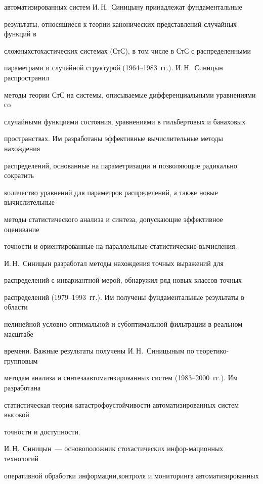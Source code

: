 автоматизированных систем И.\,Н.~Синицыну принад\-лежат фундаментальные 

результаты, относящиеся к теории канонических представлений случайных функций в 

сложных\linebreak стохастических системах (СтС), в том числе в СтС с распределенными 

параметрами и случайной структурой (1964--1983~гг.). И.\,Н.~Синицын распространил 

методы теории СтС на системы, описываемые дифференциальными уравнениями со 

случайными функциями состояния, уравнениями в гильбертовых и банаховых 

пространствах. Им разработаны эффективные вычислительные методы нахождения 

распределений, основанные на параметризации и позволяющие радикально сократить 

количество уравнений для параметров распределений, а также новые вы\-чис\-ли\-тель\-ные 

методы статистического анализа и синтеза, допускающие эффективное оценивание 

точности и ориентированные на параллельные статистические вычисления. 

     

И.\,Н.~Синицын разработал методы нахождения точных выражений для 

распределений с инвариантной мерой, обнаружил ряд новых классов точных 

распределений (1979--1993~гг.). Им получены фундаментальные результаты в области 

нелинейной условно оптимальной и субоптимальной фильтрации в реальном масштабе 

времени. Важные результаты получены И.\,Н.~Синицыным по теоретико-групповым 

методам анализа и синтеза\linebreak  автоматизированных систем (1983--2000~гг.). Им разработана 

статистическая теория катастрофоустойчивости автоматизированных систем высокой 

точности и доступности. 

     

И.\,Н.~Синицын~--- основоположник стохастических ин\-фор-\linebreak мационных технологий 

оперативной обработки информации,\linebreak контроля и мониторинга автоматизированных 


